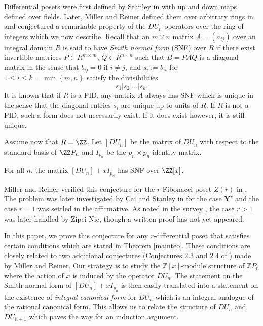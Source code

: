 Differential posets were first defined by Stanley in \cite{Stanley88} with up and down maps defined over fields. Later, Miller and Reiner defined them over arbitrary rings in \cite{Miller} and conjectured a remarkable property of the $ DU_{n}    $-operators over the ring of integers which we now describe.  Recall that an $ m \times n$ matrix $ A = (a_{ij}) $ over an integral domain $ R $ is said to have \textit{Smith normal form} (SNF) over $ R $ if there exist invertible matrices $ P \in R ^{ m \times m}$, $ Q \in R ^{ n \times n} $ such that $ B = PAQ $ is a diagonal matrix in the sense that $ b_{ij} = 0 $ if $ i \neq j $, and $ s_{i} := b_{ii} $ for $ 1 \leq i \leq k =   \min  \left  \{     m ,  n     \right \} $ satisfy the divisibilities $$ s_{1}| s_{2} | \ldots | s_{k} . $$  It is known that  if     $ R $ is a PID, any matrix $ A $ always has SNF which is unique in the sense that the diagonal entries $ s_{i} $ are unique up to units of $ R $. If $ R $ is not a PID, such a form does not necessarily exist. If it does exist however, it is  still   unique.   

Assume now that $ R =  \ZZ $. Let $ [DU_{n}]$ be the matrix of $ DU_{n} $ with respect to the standard basis of $   \ZZ P_{n} $ and $ I_{p_{n}} $ be the $ p_{n} \times p_{n} $ identity matrix.    
\begin{conjecture}{\cite[Miller-Reiner]{Miller}}  For all $n $, the matrix $  [DU_{n}] + xI_{p_{n}} $ has SNF over $ \ZZ[x] $.      
\label{mainconj}                                                                       
\end{conjecture}
Miller and Reiner verified this conjecture for the $ r $-Fibonacci poset $Z(r)$ in \cite{Miller}. The problem was later investigated by Cai and Stanley in \cite{SNFforYoung} for the case $ \mathbf{Y}^{r} $ and the case $ r = 1 $ was settled in the affirmative. As noted in the survey \cite{SNFsurvey}, the case $ r > 1 $ was later handled by Zipei Nie, though  a written proof has not yet  appeared.                               

In this paper, we prove this conjecture for any $ r$-differential poset that satisfies certain conditions which are stated in Theorem \ref{mainteo}. These conditions %
are  closely related to  two additional conjectures (Conjectures $ 2.3 $ and $ 2.4$ of \cite{Miller}) made by Miller and Reiner.    Our strategy is to study the $ \mathbb{Z}[x] $-module structure of $ \mathbb{Z} P_{n}  $ where the action of $ x $   is induced by the operator $ DU_{n}    $. The statement on the Smith normal form of $ [DU_{n}] + x I_{p_{n}} $ is then easily translated into a statement on the existence of \emph{integral canonical form} for $DU_{n} $ which   is   an integral analogue of the rational canonical form.  This allows us to relate the structure of $ DU_{n} $ and $ DU_{n+1} $    which     paves the way for an induction argument. 

